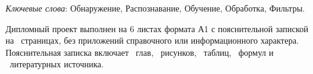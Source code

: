 \thispagestyle{empty}

\emph{Ключевые слова}: Обнаружение, Распознавание, Обучение, Обработка, Фильтры.

\vspace{4\parsep}

Дипломный проект выполнен на 6 листах формата А1 с пояснительной запиской на~\pageref*{LastPage} страницах, без приложений справочного или информационного характера. 
Пояснительная записка включает ~глав, \totfig{}~рисунков, \tottab{}~таблиц, \toteq{}~формул и \totref{}~литературных источника.


\clearpage
